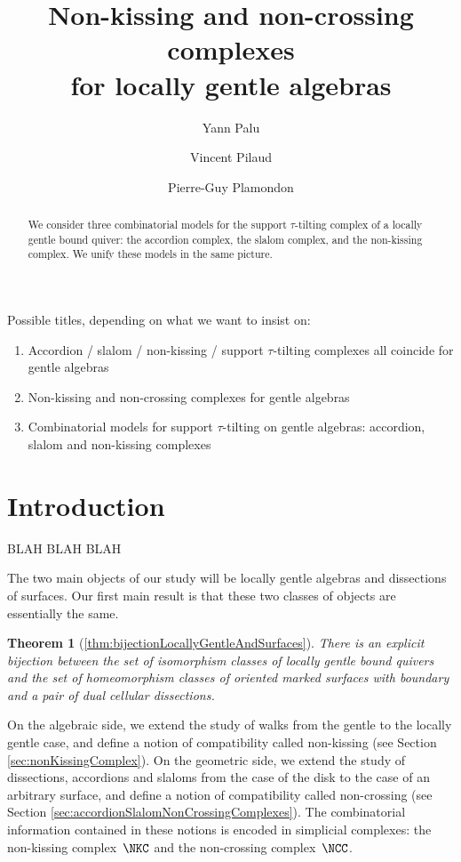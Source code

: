 \documentclass{amsart}
\title[Non-kissing and non-crossing complexes for locally gentle algebras]{Non-kissing and non-crossing complexes \\ for locally gentle algebras}
\author{Yann Palu}
\author{Vincent Pilaud}
\author{Pierre-Guy Plamondon}
\newtheorem*{theorem*}{Theorem}%
\theoremstyle{definition}
\begin{document}
\begin{abstract}
We consider three combinatorial models for the support $\tau$-tilting complex of a locally gentle bound quiver: the accordion complex, the slalom complex, and the non-kissing complex. We unify these models in the same picture.
\end{abstract}


\maketitle

Possible titles, depending on what we want to insist on:
\begin{enumerate}
\item Accordion / slalom / non-kissing / support $\tau$-tilting complexes all coincide for gentle algebras
\item Non-kissing and non-crossing complexes for gentle algebras
\item Combinatorial models for support $\tau$-tilting on gentle algebras: accordion, slalom and non-kissing complexes
\end{enumerate}

\section{Introduction}

BLAH BLAH BLAH 

The two main objects of our study will be locally gentle algebras and dissections of surfaces.
Our first main result is that these two classes of objects are essentially the same.

\begin{theorem*}[\ref{thm:bijectionLocallyGentleAndSurfaces}]
 There is an explicit bijection between the set of isomorphism classes of locally gentle bound quivers and the set of homeomorphism classes of oriented marked surfaces with boundary and a pair of dual cellular dissections.
\end{theorem*}

On the algebraic side, we extend the study of walks from the gentle to the locally gentle case, and define a notion of compatibility called non-kissing (see Section \ref{sec:nonKissingComplex}).
On the geometric side, we extend the study of dissections, accordions and slaloms from the case of the disk to the case of an arbitrary surface, and define a notion of compatibility called non-crossing (see Section \ref{sec:accordionSlalomNonCrossingComplexes}).
The combinatorial information contained in these notions is encoded in simplicial complexes: the non-kissing complex~$\NKC$ and the non-crossing complex~$\NCC$.
\end{document}
